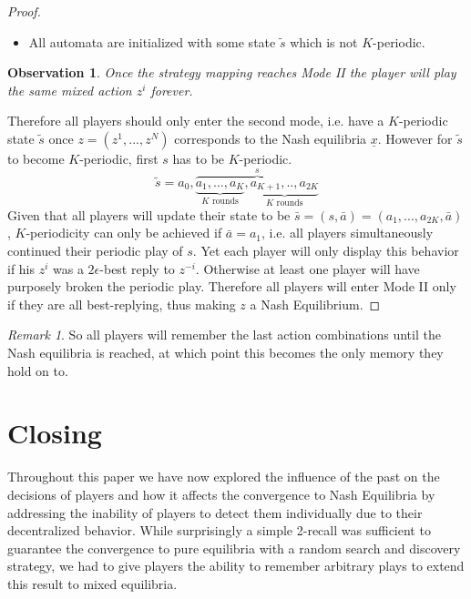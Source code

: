 \documentclass[a4paper]{article}
\theoremstyle{plain}
\newtheorem{observation}{Observation}
\theoremstyle{remark}
\newtheorem{remark}{Remark}
\newcommand{\eq}[1]{\underline{#1}}
\begin{document}
\begin{proof}
\begin{itemize}
		\item All automata are initialized with some state $\tilde{s}$ which is not $K$-periodic.
	\end{itemize}
	
	\begin{observation}
		Once the strategy mapping reaches Mode II the player will play the same mixed action
		$z^i$ forever.
	\end{observation}
    Therefore all players should only enter the second mode, i.e. have a $K$-periodic state $\tilde{s}$ once $z = (z^1, ..., z^N)$
	corresponds to the Nash equilibria $\eq{x}$. However for $\tilde{s}$ to become $K$-periodic, first $s$ has to
	be $K$-periodic.
	\[
		\tilde{s} = a_{0},  \overbrace{\underbrace{a_{1},  ..., a_{K}}_{K \text{ rounds}}, \underbrace{a_{K+1}, .., a_{2K}}_{K \text{ rounds}} }^{s}
	\]
	Given that all players will update their state to be $\bar{s} = (s, \bar{a}) = (a_1, ..., a_{2K}, \bar{a})$,
	$K$-periodicity can only be achieved if $\bar{a} = a_1$, i.e. all players simultaneously continued their periodic play of $s$.
	Yet each player will only display this behavior if his $z^i$ was a $2\epsilon$-best reply to $z^{-i}$.
    Otherwise at least one player will have purposely broken the periodic play.
	Therefore all players will enter Mode II only if they are all best-replying, thus making $z$ a Nash Equilibrium.
\end{proof}

\begin{remark}
	So all players will remember the last action combinations
	until the Nash equilibria is reached, at which point this becomes the only memory they hold on to.
\end{remark}

\section{Closing}

Throughout this paper we have now explored the influence of the past on the decisions of players
and how it affects the convergence to Nash Equilibria by addressing the inability of players to detect them individually
due to their decentralized behavior.
While surprisingly a simple 2-recall
was sufficient to guarantee the convergence to pure equilibria with a random search and discovery
strategy, we had to give players the ability to remember arbitrary plays to extend this result to mixed
equilibria. 
\end{document}
